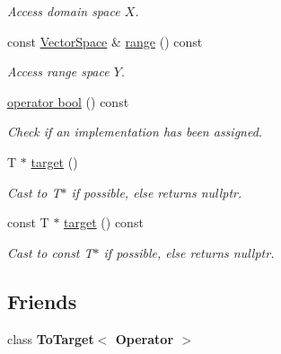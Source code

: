 \begin{DoxyCompactItemize}
\begin{DoxyCompactList}\small\item\em Access domain space $X$. \end{DoxyCompactList}\item 
\hypertarget{classSpacy_1_1Operator_a8cf3b1e3b6c5c6ab5ddc09224ed8ab24}{}const \hyperlink{classSpacy_1_1VectorSpace}{Vector\+Space} \& \hyperlink{classSpacy_1_1Operator_a8cf3b1e3b6c5c6ab5ddc09224ed8ab24}{range} () const \label{classSpacy_1_1Operator_a8cf3b1e3b6c5c6ab5ddc09224ed8ab24}

\begin{DoxyCompactList}\small\item\em Access range space $Y$. \end{DoxyCompactList}\item 
\hypertarget{classSpacy_1_1Operator_af488f6211b1e253c625fd33b93821e5d}{}\hyperlink{classSpacy_1_1Operator_af488f6211b1e253c625fd33b93821e5d}{operator bool} () const \label{classSpacy_1_1Operator_af488f6211b1e253c625fd33b93821e5d}

\begin{DoxyCompactList}\small\item\em Check if an implementation has been assigned. \end{DoxyCompactList}\item 
\hypertarget{structSpacy_1_1Mixin_1_1ToTarget_a3510786172c63a074eda127276d13392}{}T $\ast$ \hyperlink{structSpacy_1_1Mixin_1_1ToTarget_a3510786172c63a074eda127276d13392}{target} ()\label{structSpacy_1_1Mixin_1_1ToTarget_a3510786172c63a074eda127276d13392}

\begin{DoxyCompactList}\small\item\em Cast to T$\ast$ if possible, else returns nullptr. \end{DoxyCompactList}\item 
\hypertarget{structSpacy_1_1Mixin_1_1ToTarget_a98985b22f6fc98d253c8416c54a5e359}{}const T $\ast$ \hyperlink{structSpacy_1_1Mixin_1_1ToTarget_a98985b22f6fc98d253c8416c54a5e359}{target} () const\label{structSpacy_1_1Mixin_1_1ToTarget_a98985b22f6fc98d253c8416c54a5e359}

\begin{DoxyCompactList}\small\item\em Cast to const T$\ast$ if possible, else returns nullptr. \end{DoxyCompactList}\end{DoxyCompactItemize}
\subsection*{Friends}
\begin{DoxyCompactItemize}
\item 
\hypertarget{classSpacy_1_1Operator_a2e0dc7f807dfac22461d503dce72435e}{}class {\bfseries To\+Target$<$ Operator $>$}\label{classSpacy_1_1Operator_a2e0dc7f807dfac22461d503dce72435e}

\end{DoxyCompactItemize}


